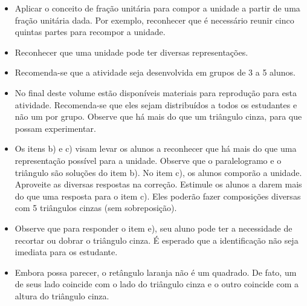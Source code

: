 \begin{atividade}\label{chap1-ativ5}
\objetivos
\begin{itemize}
\item Aplicar o conceito de fração unitária para compor a unidade a partir de uma fração unitária dada. Por exemplo, reconhecer que é necessário reunir cinco quintas partes para recompor a unidade.
\item Reconhecer que uma unidade pode ter diversas representações.
\end{itemize}

\discussoes
\begin{itemize}
\item Recomenda-se que a atividade seja desenvolvida em grupos de 3 a 5 alunos.
\item No final deste volume estão disponíveis materiais para reprodução para esta atividade. Recomenda-se que eles sejam distribuídos a todos os estudantes e não um por grupo. Observe que há mais do que um triângulo cinza, para que possam experimentar.
\item Os itens b) e c) visam levar os alunos a reconhecer que há mais do que uma  representação possível para a unidade. Observe que o paralelogramo e o triângulo são soluções do item b). No item c), os alunos comporão a unidade. Aproveite as diversas respostas na correção. Estimule os alunos a darem mais do que uma resposta para o item c). Eles poderão fazer composições diversas com 5 triângulos cinzas (sem sobreposição). 
\item Observe que para responder o item e), seu aluno pode ter a necessidade de recortar ou dobrar o triângulo cinza. É esperado que a identificação não seja imediata para os estudante.
\item Embora possa parecer, o retângulo laranja não é um quadrado. De fato, um de seus lado coincide com o lado do triângulo cinza e o outro coincide com a altura do triângulo cinza. 
  \end{itemize}


\end{atividade}
